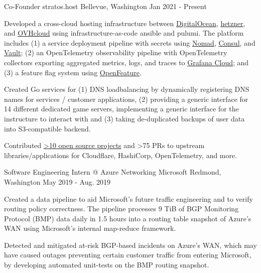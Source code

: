 \begin{cventries}
\cventry
  {Co-Founder}
  {stratos.host}
  {Bellevue, Washington}
  {Jan 2021 - Present}
  {
    \begin{cvitems}
      \item {Developed a cross-cloud hosting infrastructure between 
        \href{https://digitalocean.com/}{DigitalOcean},
        \href{https://hetzner.com/}{hetzner}, and
        \href{https://us.ovhcloud.com/}{OVHcloud} using infrastructure-as-code
        ansible and pulumi. The platform includes (1) a service deployment
        pipeline with secrets using
        \href{https://github.com/hashicorp/nomad}{Nomad},
        \href{https://github.com/hashicorp/consul}{Consul}, and
        \href{https://github.com/hashicorp/vault}{Vault}; (2) an OpenTelemetry
        observability pipeline with OpenTelemetry collectors exporting aggregated
        metrics, logs, and traces to \href{https://grafana.com}{Grafana Cloud};
        and (3) a feature flag system using
        \href{https://openfeature.dev/}{OpenFeature}.}
      \item {Created Go services for (1) DNS loadbalancing by dynamically
        registering DNS names for services / customer applications, (2) providing a generic interface for 14 different dedicated game servers,
        implementing a generic interface for the instructure to interact with
        and (3) taking de-duplicated backups of user data into S3-compatible
        backend.}
      \item{Contributed
        \href{https://github.com/bloominlabs/}{>10 open source projects} and
        >75 PRs to upstream libraries/applications for Cloudflare, HashiCorp, OpenTelemetry, and more.}
    \end{cvitems}
  }

\cventry
  {Software Engineering Intern @ Azure Networking} %
  {Microsoft} %
  {Redmond, Washington} %
  {May 2019 - Aug. 2019} %
  {
    \begin{cvitems} %
      \item {Created a data pipeline to aid Microsoft's future traffic
             engineering and to verify routing policy correctness. The pipeline
             processes 9 TiB of BGP Monitoring Protocol (BMP) data daily in 1.5 hours
             into a routing table snapshot of Azure's WAN using Microsoft's internal
             map-reduce framework.}
      \item{Detected and mitigated at-risk BGP-based incidents on Azure's WAN,
            which may have caused outages preventing certain customer traffic from
            entering Microsoft, by developing automated unit-tests on the BMP routing
            snapshot.}
    \end{cvitems}
  }


\end{cventries}
